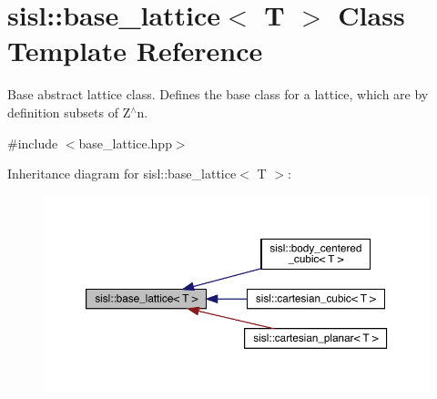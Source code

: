 \hypertarget{classsisl_1_1base__lattice}{}\section{sisl\+:\+:base\+\_\+lattice$<$ T $>$ Class Template Reference}
\label{classsisl_1_1base__lattice}


Base abstract lattice class. Defines the base class for a lattice, which are by definition subsets of Z$^\wedge$n.  




{\ttfamily \#include $<$base\+\_\+lattice.\+hpp$>$}



Inheritance diagram for sisl\+:\+:base\+\_\+lattice$<$ T $>$\+:\nopagebreak
\begin{figure}[H]
\begin{center}
\leavevmode
\includegraphics[width=350pt]{classsisl_1_1base__lattice__inherit__graph}
\end{center}
\end{figure}
